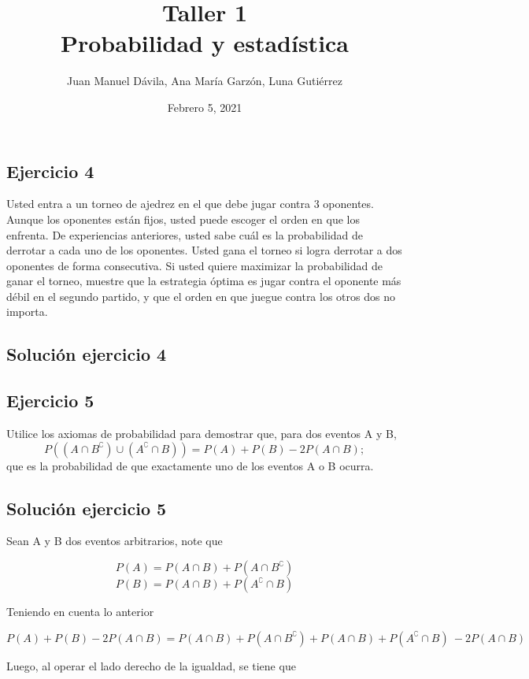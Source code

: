 \documentclass{homeworg}
\title{Taller 1 
\\Probabilidad y estadística}
\author{Juan Manuel Dávila, Ana María Garzón, Luna Gutiérrez}
\date{Febrero 5, 2021}
\begin{document}
\maketitle

\subsection*{Ejercicio 4}
Usted entra a un torneo de ajedrez en el que debe jugar contra 3 oponentes. Aunque los oponentes están fijos, usted puede escoger el orden en que los enfrenta. De experiencias anteriores, usted sabe cuál es la probabilidad de derrotar a cada uno de los oponentes. Usted gana el torneo si logra derrotar a dos oponentes de forma consecutiva. Si usted quiere maximizar la probabilidad de ganar el torneo, muestre que la estrategia óptima es jugar contra el oponente más débil en el segundo partido, y que el orden en que juegue contra los otros dos no importa.

\subsection*{Solución ejercicio 4}



\bigskip\bigskip

\subsection*{Ejercicio 5}
Utilice los axiomas de probabilidad para demostrar que, para dos eventos A y B,
\[P((A \cap B^\complement) \cup (A^\complement \cap B)) = P(A) + P(B) - 2P(A \cap B);\]
que es la probabilidad de que exactamente uno de los eventos A o B ocurra.

\subsection*{Solución ejercicio 5}

Sean A y B dos eventos arbitrarios, note que

\[P(A) = P(A \cap B) + P(A \cap B^\complement)\]
\[P(B) = P(A \cap B) + P(A^\complement \cap B)\]

Teniendo en cuenta lo anterior

\[P(A) + P(B) - 2P(A \cap B) = P(A \cap B) + P(A \cap B^\complement) + P(A \cap B) + P(A^\complement \cap B)\ - 2P(A \cap B)\]

Luego, al operar el lado derecho de la igualdad, se tiene que
\end{document}

